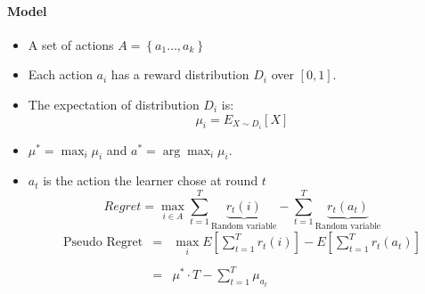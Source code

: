\paragraph{Model}
\begin{itemize}
\item A set of actions $A=\left\{ a_{1}\dots,a_{k}\right\} $
\item Each action $a_{i}$ has a reward distribution $D_{i}$ over
$[0,1]$.
\item The expectation of distribution $D_{i}$ is:
\[
\mu_{i}=E_{X\sim D_{i}}\left[X\right]
\]
\item $\mu^{*}= \max_{i}\mu_{i}$ and $a^*=\arg\max_i\mu_i$.
\item $a_{t}$ is the action the learner chose at round $t$
\[
Regret=\max_{i\in A}{\displaystyle
\sum_{t=1}^{T}\underbrace{r_{t}(i)}_{\text{Random
variable}}}-{\displaystyle
\sum_{t=1}^{T}\underbrace{r_{t}(a_{t})}_{\text{Random variable}}}
\]
\[
\begin{array}{ccc}
\text{Pseudo Regret} & = & {\displaystyle \max_{i}}E\left[{\displaystyle \sum_{t=1}^{T}r_{t}(i)}\right]-E\left[{\displaystyle \sum_{t=1}^{T}r_{t}(a_{t})}\right]\\
\\
 & = & \mu^{*}\cdot T-{\displaystyle \sum_{t=1}^{T}\mu_{a_{t}}}
\end{array}
\]
\end{itemize}

